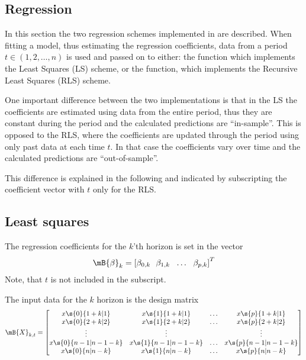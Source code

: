 \begin{appendix}


\section{Regression} \label{app:regression}

In this section the two regression schemes implemented in \onlineforecast are
described. When fitting a model, thus estimating the regression coefficients,
data from a period $t \in (1,2,\dots,n)$ is used and passed on to either: the
 function which implements the Least Squares (LS) scheme, or the
 function, which implements the Recursive Least Squares (RLS) scheme.

One important difference between the two implementations is that in the LS the
coefficients are estimated using data from the entire period, thus they are
constant during the period and the calculated predictions are
``in-sample''. This is opposed to the RLS, where the coefficients are updated
through the period using only past data at each time $t$. In that case the
coefficients vary over time and the calculated predictions are
``out-of-sample''.

This difference is explained in the following and indicated by subscripting the
coefficient vector with $t$ only for the RLS.


\subsection{Least squares}

The regression coefficients for the $k$'th horizon is set in the vector
\begin{align}
  \mB{\beta}_{k} =\left[ \beta_{0,k} ~~
    \beta_{1,k} ~~ \dots ~~ \beta_{p,k} \right]^T
\end{align}
Note, that $t$ is not included in the subscript. 

The input data for the $k$ horizon is the design matrix
\begingroup
\setlength\arraycolsep{5pt} %
\renewcommand*{\arraystretch}{2} %
\begin{align}\label{eq:ls-designmatrix}
  \mB{X}_{k,t} = 
  \begin{bmatrix}
      x\s{0}{1+k|1} & x\s{1}{1+k|1} & \ldots &
      x\s{p}{1+k|1} \\    
      x\s{0}{2+k|2} & x\s{1}{2+k|2} & \ldots &
      x\s{p}{2+k|2} \\    
      \vdots & \vdots & & \vdots\\
      x\s{0}{n-1|n-1-k} & x\s{1}{n-1|n-1-k}  &
      \ldots & x\s{p}{n-1|n-1-k}\\
      x\s{0}{n|n-k} & x\s{1}{n|n-k} & \ldots & x\s{p}{n|n-k}\\
  \end{bmatrix}
\end{align}
\endgroup


\end{appendix}
